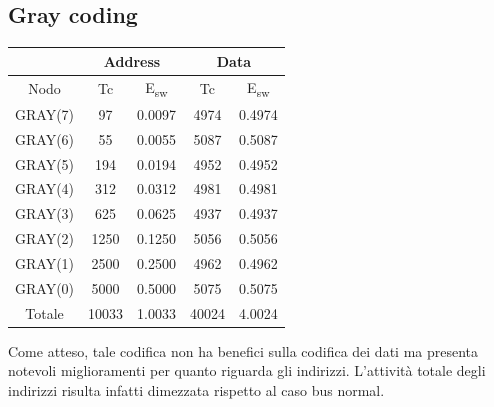 \documentclass[11pt,  english, makeidx, a4paper, titlepage, oneside]{book}
\begin{document}
\subsection{Gray coding}
\begin{center}
	\begin{tabular}{|c|c|c||c|c|}
	\hline
	& \multicolumn{2}{c}{Address} & \multicolumn{2}{c}{Data}\\
	\hline
	Nodo & Tc & E\textsubscript{sw} & Tc & E\textsubscript{sw} \\
	\hline
	GRAY(7) & 97 & 0.0097 & 4974 & 0.4974\\
	 \hline
	GRAY(6) & 55 & 0.0055 & 5087 & 0.5087\\
	\hline
	GRAY(5) & 194 & 0.0194 & 4952 & 0.4952\\
	\hline
	GRAY(4) & 312 & 0.0312 & 4981 & 0.4981\\
	\hline
	GRAY(3) & 625 & 0.0625 & 4937 & 0.4937\\
	\hline
	GRAY(2) & 1250 & 0.1250 & 5056 & 0.5056\\
	\hline
	GRAY(1) & 2500 & 0.2500 & 4962 & 0.4962\\
	\hline
	GRAY(0) & 5000 & 0.5000 & 5075 & 0.5075\\
	\hline
	Totale & 10033 & 1.0033 & 40024 & 4.0024\\
	\hline
	\end{tabular}	
\end{center}
\vspace{0.3cm}
Come atteso, tale codifica non ha benefici sulla codifica dei dati ma presenta notevoli miglioramenti per quanto riguarda gli indirizzi. L'attività totale degli indirizzi risulta infatti dimezzata rispetto al caso bus normal.
\end{document}

